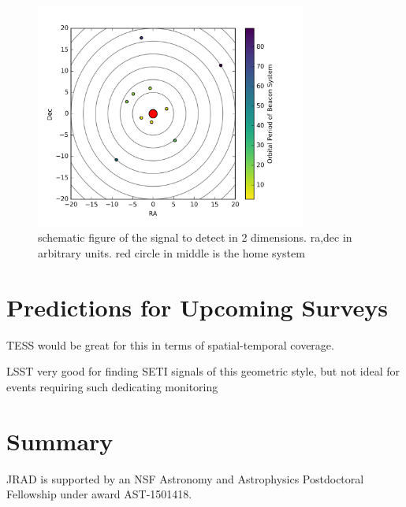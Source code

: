 \documentclass[iop]{emulateapj}
\begin{document}
\begin{figure}[]
\centering
\includegraphics[width=3.5in]{../figures/sky_per.png}
\caption{schematic figure of the signal to detect in 2 dimensions. ra,dec in arbitrary units. red circle in middle is the home system}
\label{fig:2d}
\end{figure}


\section{Predictions for Upcoming Surveys}
TESS would be great for this in terms of spatial-temporal coverage. 

LSST very good for finding SETI signals of this geometric style, but not ideal for events requiring such dedicating monitoring


\section{Summary}



\acknowledgments
JRAD is supported by an NSF Astronomy and Astrophysics Postdoctoral Fellowship under award AST-1501418.


\end{document}
